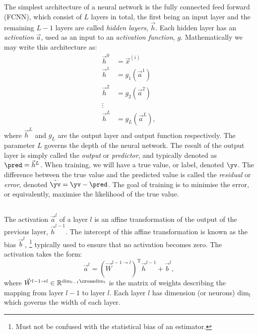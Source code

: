     \subsection{}
        The simplest architecture of a neural network is the fully connected feed forward (FCNN), which consist of $L$ layers in total, the first being an input layer and the remaining $L-1$ layers are called \textit{hidden layers}, $\vec{h}$. Each hidden layer has an \textit{activation} $\vec{a}$, used as an input to an \textit{activation function}, $g$. Mathematically we may write this architecture as:
        \begin{equation}\label{eq:ML:NN:architecture}
            \begin{split}
                \vec{h}^0 &= \vec{x}^{(i)} \\
                \vec{h}^1 &= g_1(\vec{a}^1) \\
                \vec{h}^2 &= g_2(\vec{a}^2) \\
                \vdots & \\
                \vec{h}^{L} &= g_L(\vec{a}^L),
            \end{split}
        \end{equation}
        where $\vec{h}^L$ and $g_L$ are the output layer and output function respectively. The parameter $L$ governs the depth of the neural network. The result of the output layer is simply called the \textit{output} or \textit{predictor}, and typically denoted as $\pred = \vec{h}^L$. When training, we will have a true value, or label, denoted $\yv$. The difference between the true value and the predicted value is called the \textit{residual} or \textit{error}, denoted $\tilde{\yv} = \yv - \pred$. The goal of training is to minimise the error, or equivalently, maximise the likelihood of the true value.



    \subsection{}
        The activation $\vec{a}^l$ of a layer $l$ is an affine transformation of the output of the previous layer, $\vec{h}^{l-1}$. The intercept of this affine transformation is known as the bias $\vec{b}^l$, \footnote{Must not be confused with the statistical bias of an estimator.} typically used to ensure that no activation becomes zero. The activation takes the form:
        \begin{equation}\label{eq:ML:NN:activation}
            \vec{a}^l = (\vec{W}^{l-1\to l})^\mathrm{T}\vec{h}^{l-1} + \vec{b}^l,
        \end{equation}
        where $\vec{W}^{l-1\to l} \in \mathbb{R}^{\mathrm{dim}_{l-1}\cross\mathrm{dim}_l}$ is the matrix of weights describing the mapping from layer $l-1$ to layer $l$. Each layer $l$ has dimension (or neurons) $\mathrm{dim}_l$ which governs the width of each layer. 

